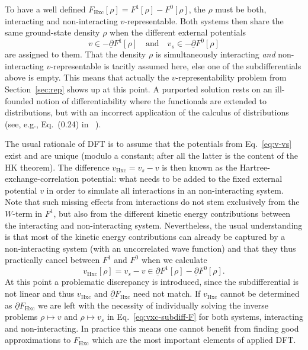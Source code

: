 \documentclass[journal=apcach,manuscript=article,layout=twocolumn]{achemso}
\newcommand{\vHxc}{v_\mathrm{Hxc}}
\newcommand{\FHxc}{F_\mathrm{Hxc}}
\begin{document}
To have a well defined $\FHxc[\rho] = F^1[\rho]-F^0[\rho]$, the $\rho$ must be both, interacting and non-interacting $v$-representable. Both systems then share the same ground-state density $\rho$ when the different external potentials
\begin{equation}\label{eq:v-vs}
    v \in -\underline\partial F^1[\rho] \quad \text{and} \quad v_s \in -\underline\partial F^0[\rho]
\end{equation}
are assigned to them.
That the density $\rho$ is simultaneously interacting \emph{and} non-interacting $v$-representable is tacitly assumed here, else one of the subdifferentials above is empty. This means that actually the $v$-representability problem from Section~\ref{sec:rep} shows up at this point. A purported solution \cite{gonis2014functionals,gonis2016reformulation,gonis2019interacting} rests on an ill-founded notion of differentiability where the functionals are extended to distributions, but with an incorrect application of the calculus of distributions (see, e.g., Eq.~(0.24) in \citeauthor{gonis2014functionals}~\cite{gonis2014functionals}).

The usual rationale of DFT is to assume that the potentials from Eq.~\eqref{eq:v-vs} exist and are unique (modulo a constant; after all the latter is the content of the HK theorem).
The difference $\vHxc = v_s-v$ is then known as the Hartree-exchange-correlation potential: what needs to be added to the fixed external potential $v$ in order to simulate all interactions in an non-interacting system. Note that such missing effects from interactions do not stem exclusively from the $W$-term in $F^1$, but also from the different kinetic energy contributions between the interacting and non-interacting system. Nevertheless, the usual understanding is that most of the kinetic energy contributions can already be captured by a non-interacting system (with an uncorrelated wave function) and that they thus practically cancel between $F^1$ and $F^0$ when we calculate
\begin{equation}\label{eq:vxc-subdiff-F}
    \vHxc[\rho] = v_s-v \in \underline\partial F^1[\rho] - \underline\partial F^0[\rho].
\end{equation}
%
At this point a problematic discrepancy is introduced, since the subdifferential is not linear and thus $\vHxc$ and $ \underline\partial\FHxc$ need not match.
If $\vHxc$ cannot be determined as $ \underline\partial\FHxc$ we are left with the necessity of individually solving the inverse problems $\rho \mapsto v$ and $\rho \mapsto v_s$ in Eq.~\eqref{eq:vxc-subdiff-F} for both systems, interacting and non-interacting. In practice this means one cannot benefit from finding good approximations to $\FHxc$ which are the most important elements of applied DFT.
\end{document}

